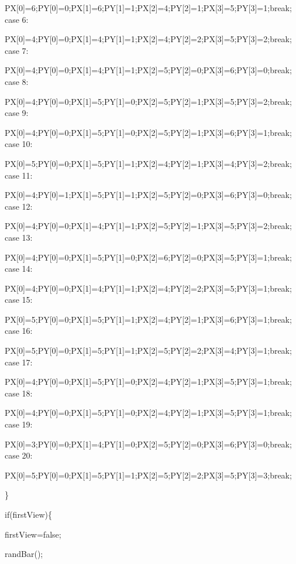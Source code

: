 \documentclass[
]{article}
\begin{document}
PX{[}0{]}=6;PY{[}0{]}=0;PX{[}1{]}=6;PY{[}1{]}=1;PX{[}2{]}=4;PY{[}2{]}=1;PX{[}3{]}=5;PY{[}3{]}=1;break;
case 6:

PX{[}0{]}=4;PY{[}0{]}=0;PX{[}1{]}=4;PY{[}1{]}=1;PX{[}2{]}=4;PY{[}2{]}=2;PX{[}3{]}=5;PY{[}3{]}=2;break;
case 7:

PX{[}0{]}=4;PY{[}0{]}=0;PX{[}1{]}=4;PY{[}1{]}=1;PX{[}2{]}=5;PY{[}2{]}=0;PX{[}3{]}=6;PY{[}3{]}=0;break;
case 8:

PX{[}0{]}=4;PY{[}0{]}=0;PX{[}1{]}=5;PY{[}1{]}=0;PX{[}2{]}=5;PY{[}2{]}=1;PX{[}3{]}=5;PY{[}3{]}=2;break;
case 9:

PX{[}0{]}=4;PY{[}0{]}=0;PX{[}1{]}=5;PY{[}1{]}=0;PX{[}2{]}=5;PY{[}2{]}=1;PX{[}3{]}=6;PY{[}3{]}=1;break;
case 10:

PX{[}0{]}=5;PY{[}0{]}=0;PX{[}1{]}=5;PY{[}1{]}=1;PX{[}2{]}=4;PY{[}2{]}=1;PX{[}3{]}=4;PY{[}3{]}=2;break;
case 11:

PX{[}0{]}=4;PY{[}0{]}=1;PX{[}1{]}=5;PY{[}1{]}=1;PX{[}2{]}=5;PY{[}2{]}=0;PX{[}3{]}=6;PY{[}3{]}=0;break;
case 12:

PX{[}0{]}=4;PY{[}0{]}=0;PX{[}1{]}=4;PY{[}1{]}=1;PX{[}2{]}=5;PY{[}2{]}=1;PX{[}3{]}=5;PY{[}3{]}=2;break;
case 13:

PX{[}0{]}=4;PY{[}0{]}=0;PX{[}1{]}=5;PY{[}1{]}=0;PX{[}2{]}=6;PY{[}2{]}=0;PX{[}3{]}=5;PY{[}3{]}=1;break;
case 14:

PX{[}0{]}=4;PY{[}0{]}=0;PX{[}1{]}=4;PY{[}1{]}=1;PX{[}2{]}=4;PY{[}2{]}=2;PX{[}3{]}=5;PY{[}3{]}=1;break;
case 15:

PX{[}0{]}=5;PY{[}0{]}=0;PX{[}1{]}=5;PY{[}1{]}=1;PX{[}2{]}=4;PY{[}2{]}=1;PX{[}3{]}=6;PY{[}3{]}=1;break;
case 16:

PX{[}0{]}=5;PY{[}0{]}=0;PX{[}1{]}=5;PY{[}1{]}=1;PX{[}2{]}=5;PY{[}2{]}=2;PX{[}3{]}=4;PY{[}3{]}=1;break;
case 17:

PX{[}0{]}=4;PY{[}0{]}=0;PX{[}1{]}=5;PY{[}1{]}=0;PX{[}2{]}=4;PY{[}2{]}=1;PX{[}3{]}=5;PY{[}3{]}=1;break;
case 18:

PX{[}0{]}=4;PY{[}0{]}=0;PX{[}1{]}=5;PY{[}1{]}=0;PX{[}2{]}=4;PY{[}2{]}=1;PX{[}3{]}=5;PY{[}3{]}=1;break;
case 19:

PX{[}0{]}=3;PY{[}0{]}=0;PX{[}1{]}=4;PY{[}1{]}=0;PX{[}2{]}=5;PY{[}2{]}=0;PX{[}3{]}=6;PY{[}3{]}=0;break;
case 20:

PX{[}0{]}=5;PY{[}0{]}=0;PX{[}1{]}=5;PY{[}1{]}=1;PX{[}2{]}=5;PY{[}2{]}=2;PX{[}3{]}=5;PY{[}3{]}=3;break;

\}

if(firstView)\{

firstView=false;

randBar();
\end{document}

